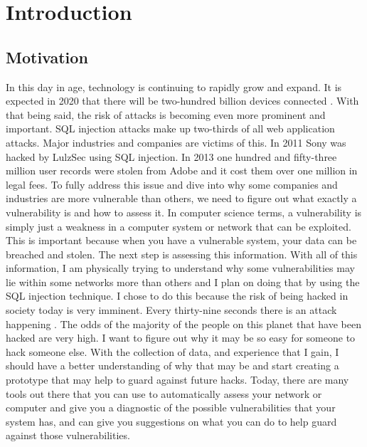 





\chapter{Introduction}



\section{Motivation}
\label{sec:motivation}

In this day in age, technology is continuing to rapidly grow and expand. It is expected in 2020 that there will be two-hundred billion devices connected \cite{Milkovich:2013}.
With that being said, the risk of attacks is becoming even more prominent and important. SQL injection attacks make up two-thirds of all web application attacks. Major industries and companies are victims of this. In 2011 Sony was hacked by LulzSec using SQL injection. In 2013 one hundred and fifty-three million user records were stolen from Adobe and it cost them over one million in legal fees. To fully address this issue and dive into why some companies and industries are more vulnerable than others, we need to figure out what exactly a vulnerability is and how to assess it. In computer science terms, a vulnerability is simply just a weakness in a computer system or network that can be exploited. This is important because when you have a vulnerable system, your data can be breached and stolen. The next step is assessing this information. With all of this information, I am physically trying to understand why some vulnerabilities may lie within some networks more than others and I plan on doing that by using the SQL injection technique. I chose to do this because the risk of being hacked in society today is very imminent. Every thirty-nine seconds there is an attack happening \cite{Milkovich:2013}.
The odds of the majority of the people on this planet that have been hacked are very high. I want to figure out why it may be so easy for someone to hack someone else. With the collection of data, and experience that I gain, I should have a better understanding of why that may be and start creating a prototype that may help to guard against future hacks. Today, there are many tools out there that you can use to automatically assess your network or computer and give you a diagnostic of the possible vulnerabilities that your system has, and can give you suggestions on what you can do to help guard against those vulnerabilities.

